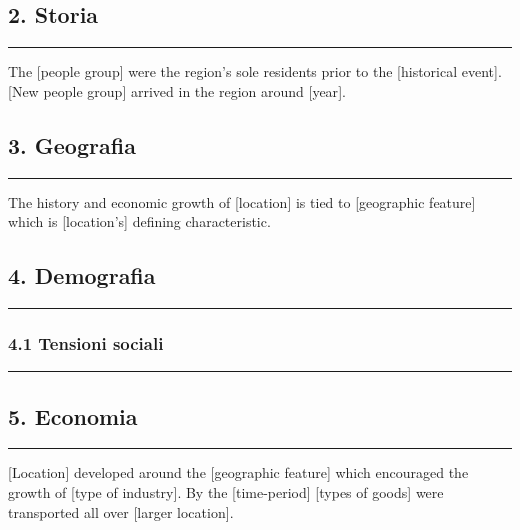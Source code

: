 \subsection{2. Storia}\label{storia}

\begin{center}\rule{0.5\linewidth}{0.5pt}\end{center}

The {[}people group{]} were the region's sole residents prior to the
{[}historical event{]}. {[}New people group{]} arrived in the region
around {[}year{]}.

\subsection{3. Geografia}\label{geografia}

\begin{center}\rule{0.5\linewidth}{0.5pt}\end{center}

The history and economic growth of {[}location{]} is tied to
{[}geographic feature{]} which is {[}location's{]} defining
characteristic.

\subsection{4. Demografia}\label{demografia}

\begin{center}\rule{0.5\linewidth}{0.5pt}\end{center}

\subsubsection{4.1 Tensioni sociali}\label{tensioni-sociali}

\begin{center}\rule{0.5\linewidth}{0.5pt}\end{center}

\subsection{5. Economia}\label{economia}

\begin{center}\rule{0.5\linewidth}{0.5pt}\end{center}

{[}Location{]} developed around the {[}geographic feature{]} which
encouraged the growth of {[}type of industry{]}. By the
{[}time-period{]} {[}types of goods{]} were transported all over
{[}larger location{]}.


